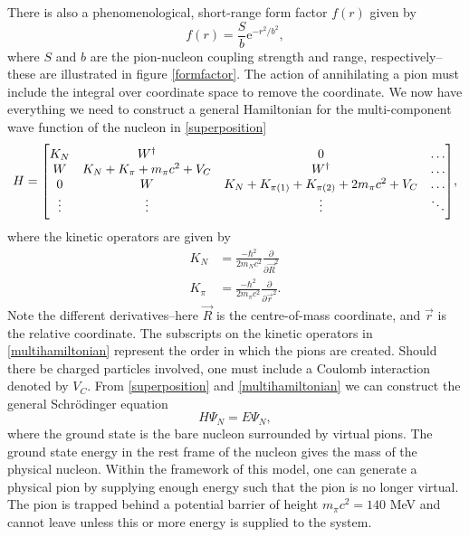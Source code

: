 There is also a phenomenological, short-range form factor $f(r)$ given by
\begin{equation}\label{formfactoreq}
	f(r) = \frac{S}{b} \text{e}^{-r^2/b^2},
\end{equation}
where $S$ and $b$ are the pion-nucleon coupling strength and range, respectively--these are illustrated in figure \ref{formfactor}. The action of annihilating a pion must include the integral over coordinate space to remove the coordinate. We now have everything we need to construct a general Hamiltonian for the multi-component wave function of the nucleon in \eqref{superposition}
\begin{equation} \label{multihamiltonian}
	H = \mqty[K_N & W^\dagger & 0 &\ldots \\
	W & K_N+K_\pi+m_\pi c^2+V_C & W^\dagger & \ldots \\
	0 & W & K_N+K_{\pi(1)}+K_{\pi(2)}+2m_\pi c^2 +V_C & \ldots \\
	\vdots & \vdots & \vdots &\ddots ],
\end{equation}
where the kinetic operators are given by
\begin{align} \label{multiN}
	K_N &= \frac{-\hbar^2}{2 m_N c^2} \frac{\partial}{\partial \vec{R}^2} \\
	K_\pi &= \frac{-\hbar^2}{2 m_\pi c^2} \frac{\partial}{\partial \vec{r}^2} \label{kinpi}.
\end{align} 
Note the different derivatives--here $\vec{R}$ is the centre-of-mass coordinate, and $\vec{r}$ is the relative coordinate. The subscripts on the kinetic operators in \eqref{multihamiltonian} represent the order in which the pions are created. Should there be charged particles involved, one must include a Coulomb interaction denoted by $V_C$. From \eqref{superposition} and \eqref{multihamiltonian} we can construct the general Schrödinger equation
\begin{equation} \label{MultiSE}
	H \Psi_N = E \Psi_N,
\end{equation}
where the ground state is the bare nucleon surrounded by virtual pions. The ground state energy in the rest frame of the nucleon gives the mass of the physical nucleon. Within the framework of this model, one can generate a physical pion by supplying enough energy such that the pion is no longer virtual. The pion is trapped behind a potential barrier of height $m_\pi c^2 = 140$ MeV and cannot leave unless this or more energy is supplied to the system.  
